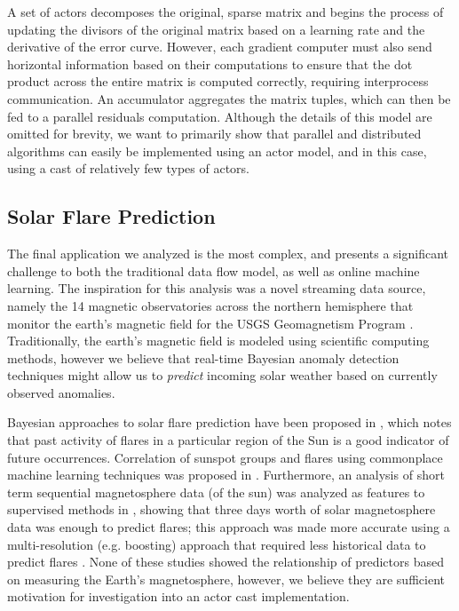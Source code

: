 \documentclass[conference,twocolumn,10pt]{IEEEtran}
\begin{document}
A set of actors decomposes the original, sparse matrix and begins the process of updating the divisors of the original matrix based on a learning rate and the derivative of the error curve. However, each gradient computer must also send horizontal information based on their computations to ensure that the dot product across the entire matrix is computed correctly, requiring interprocess communication. An accumulator aggregates the matrix tuples, which can then be fed to a parallel residuals computation. Although the details of this model are omitted for brevity, we want to primarily show that parallel and distributed algorithms can easily be implemented using an actor model, and in this case, using a cast of relatively few types of actors.

\subsection{Solar Flare Prediction}

The final application we analyzed is the most complex, and presents a significant challenge to both the traditional data flow model, as well as online machine learning. The inspiration for this analysis was a novel streaming data source, namely the 14 magnetic observatories across the northern hemisphere that monitor the earth's magnetic field for the USGS Geomagnetism Program \cite{love_usgs_2011}. Traditionally, the earth's magnetic field is modeled using scientific computing methods, however we believe that real-time Bayesian anomaly detection techniques \cite{hill_real-time_2007} might allow us to \textit{predict} incoming solar weather based on currently observed anomalies.

Bayesian approaches to solar flare prediction have been proposed in \cite{wheatland_bayesian_2004}, which notes that past activity of flares in a particular region of the Sun is a good indicator of future occurrences. Correlation of sunspot groups and flares using commonplace machine learning techniques was proposed in \cite{qahwaji_automatic_2007}. Furthermore, an analysis of short term sequential magnetosphere data (of the sun) was analyzed as features to supervised methods in \cite{yu_short-term_2009}, showing that three days worth of solar magnetosphere data was enough to predict flares; this approach was made more accurate using a multi-resolution (e.g. boosting) approach that required less historical data to predict flares \cite{yu_short-term_2010}. None of these studies showed the relationship of predictors based on measuring the Earth's magnetosphere, however, we believe they are sufficient motivation for investigation into an actor cast implementation.
\end{document}
